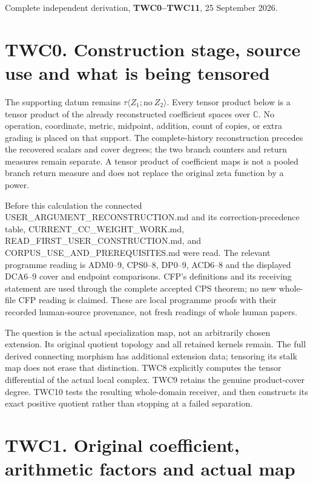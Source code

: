 Complete independent derivation, \textbf{TWC0--TWC11}, 25 September
2026.

\section{TWC0. Construction stage, source use and what is being
tensored}\label{twc0.-construction-stage-source-use-and-what-is-being-tensored}

The supporting datum remains
\(\tau\langle Z_1;\mathrm{no}\ Z_2\rangle\). Every tensor product below
is a tensor product of the already reconstructed coefficient spaces over
\(\mathbb C\). No operation, coordinate, metric, midpoint, addition,
count of copies, or extra grading is placed on that support. The
complete-history reconstruction precedes the recovered scalars and cover
degrees; the two branch counters and return measures remain separate. A
tensor product of coefficient maps is not a pooled branch return measure
and does not replace the original zeta function by a power.

Before this calculation the connected USER\_ARGUMENT\_RECONSTRUCTION.md
and its correction-precedence table, CURRENT\_CC\_WEIGHT\_WORK.md,
READ\_FIRST\_USER\_CONSTRUCTION.md, and
CORPUS\_USE\_AND\_PREREQUISITES.md were read. The relevant programme
reading is ADM0--9, CPS0--8, DP0--9, ACD6--8 and the displayed DCA6--9
cover and endpoint comparisons. CFP's definitions and its receiving
statement are used through the complete accepted CPS theorem; no new
whole-file CFP reading is claimed. These are local programme proofs with
their recorded human-source provenance, not fresh readings of whole
human papers.

The question is the actual specialization map, not an arbitrarily chosen
extension. Its original quotient topology and all retained kernels
remain. The full derived connecting morphism has additional extension
data; tensoring its stalk map does not erase that distinction. TWC8
explicitly computes the tensor differential of the actual local complex.
TWC9 retains the genuine product-cover degree. TWC10 tests the resulting
whole-domain receiver, and then constructs its exact positive quotient
rather than stopping at a failed separation.

\section{TWC1. Original coefficient, arithmetic factors and actual
map}\label{twc1.-original-coefficient-arithmetic-factors-and-actual-map}

